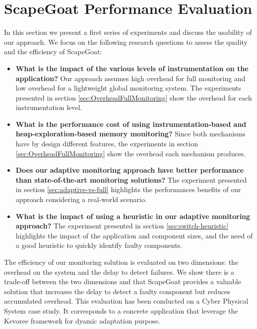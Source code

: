 \section{ScapeGoat Performance Evaluation\label{sec:evaluation}}
In this section we present a first series of experiments and discuss the usability of our approach.
We focus on the following research questions to assess the quality and the efficiency of ScapeGoat:

\begin{itemize}
	\item \textbf{What is the impact of the various levels of instrumentation on the application?}
	Our approach assumes high overhead for full monitoring and low overhead for a lightweight global monitoring system. The experiments presented in section \ref{sec:OverheadFullMonitoring} show the overhead for each instrumentation level.
	\item \textbf{What is the performance cost of using instrumentation-based and heap-exploration-based memory monitoring?}
	Since both mechanisms have by design different features, the experiments in section \ref{sec:OverheadFullMonitoring} show the overhead each mechanism produces. 
	\item \textbf{Does our adaptive monitoring approach have better performance than state-of-the-art monitoring solutions?}
	The experiment presented in section \ref{sec:adaptive-vs-full} highlights the performances benefits of our approach considering a real-world scenario.
	\item \textbf{What is the impact of using a heuristic in our adaptive monitoring approach?}
	The experiment presented in section \ref{sec:switch-heuristic} highlights the impact of the application and component sizes, and the need of a good heuristic to quickly identify faulty components.
\end{itemize}

The efficiency of our monitoring solution is evaluated on two dimensions: the overhead on the system and the delay to detect failures.
We show there is a trade-off between the two dimensions and that ScapeGoat provides a valuable solution that increases the delay to detect a faulty component but reduces accumulated overhead.
This evaluation has been conducted on a Cyber Physical System case study.
It corresponds to a concrete application that leverage the Kevoree framework for dyamic adaptation purpose.



